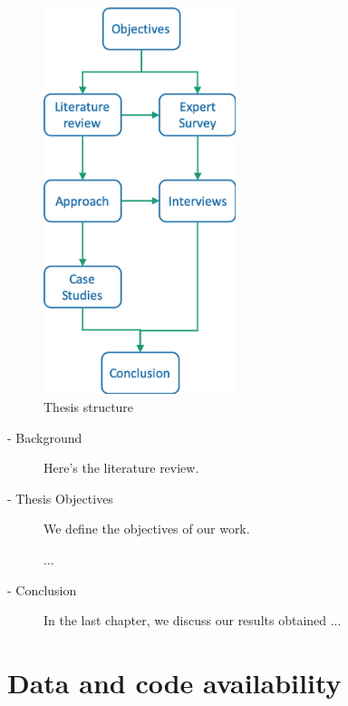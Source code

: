 \begin{figure}[htb!]
\centering \includegraphics[width=0.5\textwidth]{graphics/thesis-structure}
\caption{Thesis structure}
\label{fig:thesis-structure}
\end{figure}

\begin{description}
    \item[ - Background]
Here's the literature review.

    \item[ - Thesis Objectives]
We define the objectives of our work.

...

    \item[ - Conclusion]
In the last chapter, we discuss our results obtained ...

\end{description}

\section{Data and code availability}

